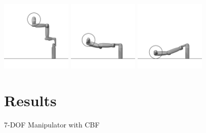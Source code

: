 \begin{figure}[H]
    \centering
    \includegraphics[width=0.3\textwidth]{Figures/Examples/7DOF/Frame0.png}
    \includegraphics[width=0.3\textwidth]{Figures/Examples/7DOF/Frame56CBF.png}
    \includegraphics[width=0.3\textwidth]{Figures/Examples/7DOF/Frame300CBF.png}
    \caption{7-DOF Manipulator with CBF}
    \label{fig:7dofcbf2}
\section{Results}
\end{figure}